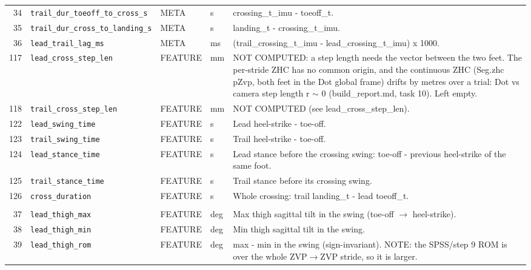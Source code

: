 \begin{longtable}{@{}r p{3.6cm} p{1.55cm} p{1.15cm} p{8.6cm}@{}}
34 & \texttt{trail\_\allowbreak{}dur\_\allowbreak{}toeoff\_\allowbreak{}to\_\allowbreak{}cross\_\allowbreak{}s} & META & s & crossing\_t\_imu - toeoff\_t. \\
35 & \texttt{trail\_\allowbreak{}dur\_\allowbreak{}cross\_\allowbreak{}to\_\allowbreak{}landing\_\allowbreak{}s} & META & s & landing\_t - crossing\_t\_imu. \\
36 & \texttt{lead\_\allowbreak{}trail\_\allowbreak{}lag\_\allowbreak{}ms} & META & ms & (trail\_crossing\_t\_imu - lead\_crossing\_t\_imu) x 1000. \\
117 & \texttt{lead\_\allowbreak{}cross\_\allowbreak{}step\_\allowbreak{}len} & FEATURE & mm & NOT COMPUTED: a step length needs the vector between the two feet. The per-stride ZHC has no common origin, and the continuous ZHC (Seg.zhc pZvp, both feet in the Dot global frame) drifts by metres over a trial: Dot vs camera step length r $\sim$ 0 (build\_report.md, task 10). Left empty. \\
118 & \texttt{trail\_\allowbreak{}cross\_\allowbreak{}step\_\allowbreak{}len} & FEATURE & mm & NOT COMPUTED (see lead\_cross\_step\_len). \\
122 & \texttt{lead\_\allowbreak{}swing\_\allowbreak{}time} & FEATURE & s & Lead heel-strike - toe-off. \\
123 & \texttt{trail\_\allowbreak{}swing\_\allowbreak{}time} & FEATURE & s & Trail heel-strike - toe-off. \\
124 & \texttt{lead\_\allowbreak{}stance\_\allowbreak{}time} & FEATURE & s & Lead stance before the crossing swing: toe-off - previous heel-strike of the same foot. \\
125 & \texttt{trail\_\allowbreak{}stance\_\allowbreak{}time} & FEATURE & s & Trail stance before its crossing swing. \\
126 & \texttt{cross\_\allowbreak{}duration} & FEATURE & s & Whole crossing: trail landing\_t - lead toeoff\_t. \\
\addlinespace
\multicolumn{5}{@{}l}{\textbf{Segment tilt angles over the swing (Dot) (42)}} \\*
37 & \texttt{lead\_\allowbreak{}thigh\_\allowbreak{}max} & FEATURE & deg & Max thigh sagittal tilt in the swing (toe-off $\rightarrow$ heel-strike). \\
38 & \texttt{lead\_\allowbreak{}thigh\_\allowbreak{}min} & FEATURE & deg & Min thigh sagittal tilt in the swing. \\
39 & \texttt{lead\_\allowbreak{}thigh\_\allowbreak{}rom} & FEATURE & deg & max - min in the swing (sign-invariant). NOTE: the SPSS/step 9 ROM is over the whole ZVP$\rightarrow$ZVP stride, so it is larger. \\

\end{longtable}
